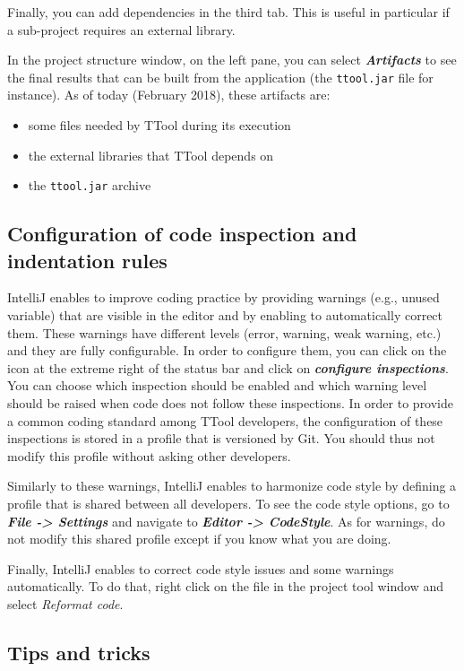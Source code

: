 \documentclass[12pt]{article}
\begin{document}
Finally, you can add dependencies in the third tab. This is useful in particular
if a sub-project requires an external library.

In the project structure window, on the left pane, you can select
\textbf{\emph{Artifacts}} to see the final results that can be built from the application
(the \texttt{ttool.jar} file for instance). As of today (February 2018), these
artifacts are:
\begin{itemize}
    \item some files needed by TTool during its execution
    \item the external libraries that TTool depends on
    \item the \texttt{ttool.jar} archive
\end{itemize}

\subsection{Configuration of code inspection and indentation rules}

IntelliJ enables to improve coding practice by providing warnings (e.g., unused
variable) that are
visible in the editor and by enabling to automatically correct them. These
warnings have different levels (error, warning, weak warning, etc.) and they are
fully configurable. In order to configure them, you can click on the icon at the
extreme right of the status bar and click on \textbf{\emph{configure inspections}}. You
can choose which inspection should be enabled and which warning level should be
raised when code does not follow these inspections. In order to provide a
common coding standard among TTool developers, the configuration of these
inspections is stored in a profile that is versioned by Git. You should thus not
modify this profile without asking other developers.

Similarly to these warnings, IntelliJ enables to harmonize code style by
defining a profile that is shared between all developers. To see the code style
options, go to \textbf{\emph{File -> Settings}} and navigate to
 \textbf{\emph{Editor -> CodeStyle}}. 
As for warnings, do not modify this shared profile except if you know
what you are doing.

Finally, IntelliJ enables to correct code style issues and some warnings
automatically. To do that, right click on the file in the project tool window
and select \emph{Reformat code}.

\subsection{Tips and tricks}
\end{document}
